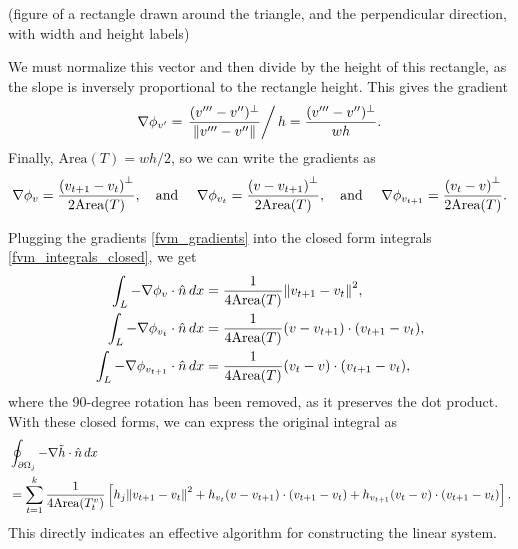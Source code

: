 \vskip 0.2in
(figure of a rectangle drawn around the triangle, and the perpendicular direction, with width and height labels)
\vskip 0.2in

We must normalize this vector and then divide by the height of this rectangle, as the slope is inversely proportional to the rectangle height.
This gives the gradient
$$
    \nabla\phi_{v^{\prime}} = \left.\frac{(v^{\prime\prime\prime} - v^{\prime\prime})^\perp}{\norm{v^{\prime\prime\prime} - v^{\prime\prime}}}\right/h = \frac{(v^{\prime\prime\prime} - v^{\prime\prime})^\perp}{wh}.
$$
Finally, $\text{Area}(T) = wh/2$, so we can write the gradients as
\begin{equation}\label{fvm_gradients}
    \nabla\phi_v = \frac{\left(v_{t+1} - v_t\right)^\perp}{2\text{Area}(T)},\text{\quad and \quad}
    \nabla\phi_{v_t} = \frac{\left(v - v_{t+1}\right)^\perp}{2\text{Area}(T)},\text{\quad and \quad}
    \nabla\phi_{v_{t+1}} = \frac{\left(v_t - v\right)^\perp}{2\text{Area}(T)}.
\end{equation}

Plugging the gradients \eqref{fvm_gradients} into the closed form integrals \eqref{fvm_integrals_closed}, we get
\begin{equation}\label{fvm_closed_form_integrals}
\begin{split}
    \int_L -\nabla\phi_v\cdot\hat{n}\,dx
        &= \frac{1}{4\text{Area}(T)}\norm{v_{t+1} - v_t}^2,\\
    \int_L -\nabla\phi_{v_t}\cdot\hat{n}\,dx
        &= \frac{1}{4\text{Area}(T)}(v - v_{t+1})\cdot(v_{t+1} - v_t),\\
    \int_L -\nabla\phi_{v_{t+1}}\cdot\hat{n}\,dx
        &= \frac{1}{4\text{Area}(T)}(v_t - v)\cdot(v_{t+1} - v_t),
\end{split}
\end{equation}
where the 90-degree rotation has been removed, as it preserves the dot product.
With these closed forms, we can express the original integral as
\begin{equation}\label{flux_integral_summation}
\begin{split}
&\oint_{{\partial\Omega}_j} -\nabla \tilde{h}\cdot\hat{n}\,dx\\
    &=
    \sum_{t=1}^k
        \frac{1}{4\text{Area}(T^v_t)}
        \left[
        h_j \norm{v_{t+1} - v_{t}}^2
        +h_{v_t}(v - v_{t+1})\cdot(v_{t+1} - v_{t})
        +h_{v_{t+1}}(v_t - v)\cdot(v_{t+1} - v_{t})
        \right].
\end{split}
\end{equation}
This directly indicates an effective algorithm for constructing the linear system.

